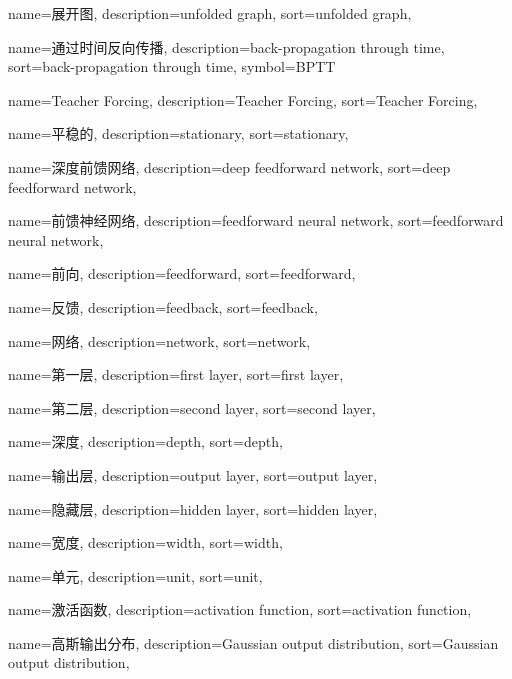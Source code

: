 {
  name=展开图,
  description={unfolded graph},
  sort={unfolded graph},
}

{
  name=通过时间反向传播,
  description={back-propagation through time},
  sort={back-propagation through time},
  symbol={BPTT}
}

{
  name=Teacher Forcing,
  description={Teacher Forcing},
  sort={Teacher Forcing},
}

{
  name=平稳的,
  description={stationary},
  sort={stationary},
}

{
  name=深度前馈网络,
  description={deep feedforward network},
  sort={deep feedforward network},
}

{
  name=前馈神经网络,
  description={feedforward neural network},
  sort={feedforward neural network},
}

{
  name=前向,
  description={feedforward},
  sort={feedforward},
}

{
  name=反馈,
  description={feedback},
  sort={feedback},
}

{
  name=网络,
  description={network},
  sort={network},
}

{
  name=第一层,
  description={first layer},
  sort={first layer},
}

{
  name=第二层,
  description={second layer},
  sort={second layer},
}

{
  name=深度,
  description={depth},
  sort={depth},
}

{
  name=输出层,
  description={output layer},
  sort={output layer},
}

{
  name=隐藏层,
  description={hidden layer},
  sort={hidden layer},
}

{
  name=宽度,
  description={width},
  sort={width},
}

{
  name=单元,
  description={unit},
  sort={unit},
}

{
  name=激活函数,
  description={activation function},
  sort={activation function},
}

{
  name=高斯输出分布,
  description={Gaussian output distribution},
  sort={Gaussian output distribution},
}

